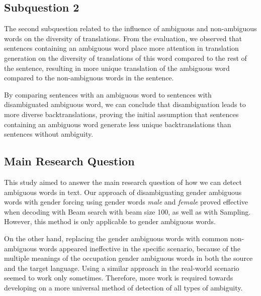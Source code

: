 \subsection{Subquestion 2} %
\label{sec:Discussion:Answers:2}

The second subquestion related to the influence of ambiguous and non-ambiguous words on the diversity of translations. From the evaluation, we observed that sentences containing an ambiguous word place more attention in translation generation on the diversity of translations of this word compared to the rest of the sentence, resulting in more unique translation of the ambiguous word compared to the non-ambiguous words in the sentence.

By comparing sentences with an ambiguous word to sentences with disambiguated ambiguous word, we can conclude that disambiguation leads to more diverse backtranslations, proving the initial assumption that sentences containing an ambiguous word generate less unique backtranslations than sentences without ambiguity. 

\subsection{Main Research Question} %
\label{sec:Discussion:Answers:Main}

This study aimed to answer the main research question of how we can detect ambiguous words in text. Our approach of disambiguating gender ambiguous words with gender forcing using gender words \textit{male} and \textit{female} proved effective when decoding with Beam search with beam size 100, as well as with Sampling. However, this method is only applicable to gender ambiguous words.

On the other hand, replacing the gender ambiguous words with common non-ambiguous words appeared ineffective in the specific scenario, because of the multiple meanings of the occupation gender ambiguous words in both the source and the target language. Using a similar approach in the real-world scenario seemed to work only sometimes. Therefore, more work is required towards developing on a more universal method of detection of all types of ambiguity.

